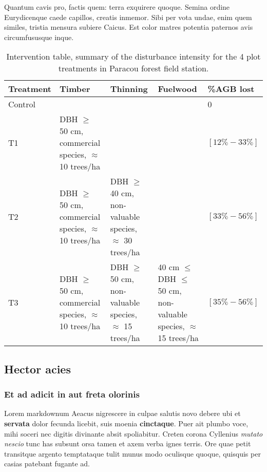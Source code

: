 \documentclass[fleqn,10pt]{article} %
\begin{document}
\normalsize

Quantum cavis pro, factis quem: terra exquirere quoque.
Semina ordine Eurydicenque caede capillos, creatis inmemor.
Sibi per vota undae, enim quem similes, tristia mensura subiere Caicus.
Est color matres potentia paternos avis circumfususque inque.



\scriptsize

\begin{table}

\caption{\label{tab:paracou}Intervention table, summary of the disturbance intensity for the 4 plot treatments in Paracou forest field station.}
\centering
\begin{tabu} to 
\toprule
Treatment & Timber & Thinning & Fuelwood & \%AGB lost\\
\midrule
Control &  &  &  & 0\\
T1 & DBH $\geq$ 50 cm, commercial species, $\approx$ 10 trees/ha &  &  & $[12\%-33\%]$\\
T2 & DBH $\geq$ 50 cm, commercial species, $\approx$ 10 trees/ha & DBH $\geq$ 40 cm, non-valuable species, $\approx$ 30 trees/ha &  & $[33\%-56\%]$\\
T3 & DBH $\geq$ 50 cm, commercial species, $\approx$ 10 trees/ha & DBH $\geq$ 50 cm, non-valuable species, $\approx$ 15 trees/ha & 40 cm $\leq$ DBH $\leq$ 50 cm, non-valuable species, $\approx$ 15 trees/ha & $[35\%-56\%]$\\
\bottomrule
\end{tabu}
\end{table}

\normalsize

\hypertarget{hector-acies}{%
\subsection{Hector acies}\label{hector-acies}}

\hypertarget{et-ad-adicit-in-aut-freta-olorinis}{%
\subsubsection{Et ad adicit in aut freta olorinis}\label{et-ad-adicit-in-aut-freta-olorinis}}

Lorem markdownum Aeacus nigrescere in culpae salutis novo debere ubi et \textbf{servata} dolor fecunda licebit, suis moenia \textbf{cinctaque}.
Puer ait plumbo voce, mihi soceri nec digitis divinante absit spoliabitur.
Creten corona Cyllenius \emph{mutato nescio} tunc has subsunt orsa tamen et axem verba ignes terris.
Ore quae petit transitque argento temptataque tulit munus modo oculisque quoque, quisquis per casias patebant fugante ad.
\end{document}
